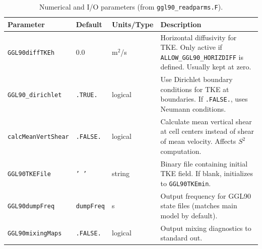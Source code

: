 \documentclass[12pt,letterpaper]{article}
\begin{document}
\begin{table}[h!]
\centering
\caption{Numerical and I/O parameters (from \texttt{ggl90\_readparms.F}).}
\label{tab:numerical_params}
\begin{tabular}{@{}lllp{5.5cm}@{}}
\toprule
\textbf{Parameter} & \textbf{Default} & \textbf{Units/Type} & \textbf{Description} \\
\midrule
\texttt{GGL90diffTKEh} & 0.0 & m$^2$/s & Horizontal diffusivity for TKE.
                                         Only active if
                                         \texttt{ALLOW\_GGL90\_HORIZDIFF}
                                         is defined. Usually kept at zero. \\[6pt]

\texttt{GGL90\_dirichlet} & \texttt{.TRUE.} & logical & Use Dirichlet
                                                         boundary conditions
                                                         for TKE at boundaries.
                                                         If \texttt{.FALSE.},
                                                         uses Neumann conditions. \\[6pt]

\texttt{calcMeanVertShear} & \texttt{.FALSE.} & logical & Calculate mean
                                                           vertical shear at
                                                           cell centers instead
                                                           of shear of mean
                                                           velocity. Affects
                                                           $S^2$ computation. \\[6pt]

\texttt{GGL90TKEFile} & \texttt{' '} & string & Binary file containing
                                                 initial TKE field. If blank,
                                                 initializes to
                                                 \texttt{GGL90TKEmin}. \\[6pt]

\texttt{GGL90dumpFreq} & \texttt{dumpFreq} & s & Output frequency for GGL90
                                                  state files (matches main
                                                  model by default). \\[6pt]

\texttt{GGL90mixingMaps} & \texttt{.FALSE.} & logical & Output mixing
                                                         diagnostics to
                                                         standard out. \\[6pt]


\end{tabular}
\end{table}
\end{document}
